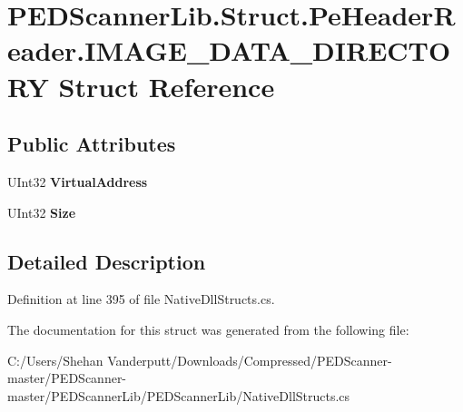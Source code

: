 \hypertarget{struct_p_e_d_scanner_lib_1_1_struct_1_1_pe_header_reader_1_1_i_m_a_g_e___d_a_t_a___d_i_r_e_c_t_o_r_y}{}\section{P\+E\+D\+Scanner\+Lib.\+Struct.\+Pe\+Header\+Reader.\+I\+M\+A\+G\+E\+\_\+\+D\+A\+T\+A\+\_\+\+D\+I\+R\+E\+C\+T\+O\+RY Struct Reference}
\label{struct_p_e_d_scanner_lib_1_1_struct_1_1_pe_header_reader_1_1_i_m_a_g_e___d_a_t_a___d_i_r_e_c_t_o_r_y}
\subsection*{Public Attributes}
\begin{DoxyCompactItemize}
\item 
\mbox{\label{struct_p_e_d_scanner_lib_1_1_struct_1_1_pe_header_reader_1_1_i_m_a_g_e___d_a_t_a___d_i_r_e_c_t_o_r_y_af52e7d64352aa6ecf22232d3670fe089}} 
U\+Int32 {\bfseries Virtual\+Address}
\item 
\mbox{\label{struct_p_e_d_scanner_lib_1_1_struct_1_1_pe_header_reader_1_1_i_m_a_g_e___d_a_t_a___d_i_r_e_c_t_o_r_y_a656b04455d4d9815865e58ae7a9bab0c}} 
U\+Int32 {\bfseries Size}
\end{DoxyCompactItemize}


\subsection{Detailed Description}


Definition at line 395 of file Native\+Dll\+Structs.\+cs.



The documentation for this struct was generated from the following file\+:\begin{DoxyCompactItemize}
\item 
C\+:/\+Users/\+Shehan Vanderputt/\+Downloads/\+Compressed/\+P\+E\+D\+Scanner-\/master/\+P\+E\+D\+Scanner-\/master/\+P\+E\+D\+Scanner\+Lib/\+P\+E\+D\+Scanner\+Lib/Native\+Dll\+Structs.\+cs\end{DoxyCompactItemize}
